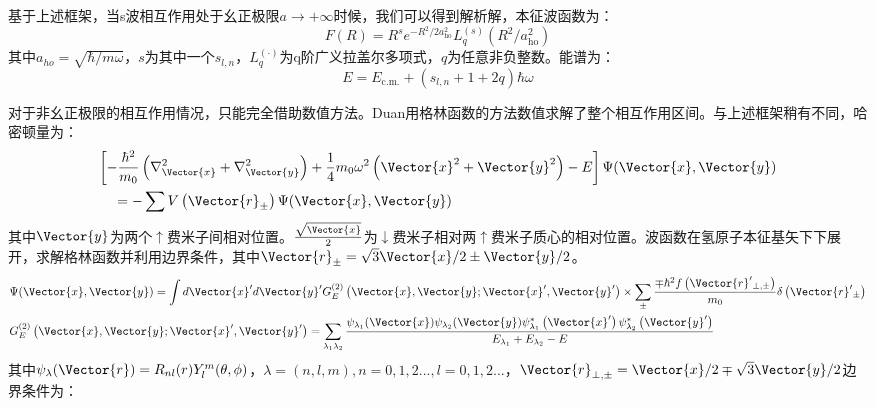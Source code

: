 基于上述框架，当s波相互作用处于幺正极限$a\to+\infty$时候，我们可以得到解析解，本征波函数为：
\begin{equation}
 F(R)=R^{s} e^{-R^{2} / 2 a_{\mathrm{ho}}^{2}} L_{q}^{(s)}\left(R^{2} / a_{\mathrm{ho}}^{2}\right)
\end{equation}
其中$a_{ho}=\sqrt{\hbar/m\omega}$，$s$为其中一个$s_{l,n}$，$L^{(\cdot)}_q$为q阶广义拉盖尔多项式，$q$为任意非负整数。能谱为：
\begin{equation}
E=E_{\mathrm{c} . \mathrm{m} .}+\left(s_{l, n}+1+2 q\right) \hbar \omega
\end{equation}

对于非幺正极限的相互作用情况，只能完全借助数值方法。Duan\cite{LmDuan2007levelcrossing}用格林函数的方法数值求解了整个相互作用区间。与上述框架稍有不同，哈密顿量为：
\begin{equation}
\begin{aligned}
&{\left[-\frac{\hbar^{2}}{m_{0}}\left(\nabla_{\Vector{x}}^{2}+\nabla_{\Vector{y}}^{2}\right)+\frac{1}{4} m_{0} \omega^{2}\left(\Vector{x}^{2}+\Vector{y}^{2}\right)-E\right] \Psi(\Vector{x}, \Vector{y})} \\
&\quad=-\sum V\left(\Vector{r}_{\pm}\right) \Psi(\Vector{x}, \Vector{y})
\end{aligned}
\end{equation}
其中$\Vector{y}$为两个$\uparrow$费米子间相对位置。$\frac{\sqrt{\Vector{x}}}{2}$为$\downarrow$费米子相对两$\uparrow$费米子质心的相对位置。波函数在氢原子本征基矢下下展开，求解格林函数并利用边界条件，其中$\Vector{r}_{\pm}=\sqrt{3} \Vector{x} / 2 \pm \Vector{y} / 2$。
\begin{equation}
\begin{aligned}
&\Psi(\Vector{x}, \Vector{y})= \int d \Vector{x}^{\prime} d \Vector{y}^{\prime} G_{E}^{(2)}\left(\Vector{x}, \Vector{y} ; \Vector{x}^{\prime}, \Vector{y}^{\prime}\right)\times \sum_{\pm} \frac{\mp \hbar^{2} f\left(\Vector{r}^{\prime}{ }_{\perp, \pm}\right)}{m_{0}} \delta\left(\Vector{r}^{\prime}{ }_{\pm}\right)\\
&G_{E}^{(2)}\left(\Vector{x}, \Vector{y} ; \Vector{x}^{\prime}, \Vector{y}^{\prime}\right)=\sum_{\lambda_{1} \lambda_{2}} \frac{\psi_{\lambda_{1}}(\Vector{x}) \psi_{\lambda_{2}}(\Vector{y}) \psi_{\lambda_{1}}^{*}\left(\Vector{x}^{\prime}\right) \psi_{\lambda_{2}}^{*}\left(\Vector{y}^{\prime}\right)}{E_{\lambda_{1}}+E_{\lambda_{2}}-E}\\
\end{aligned}
\end{equation}
其中$\psi_\lambda(\Vector{r}) = R_{nl}(r)Y_l^m(\theta,\phi)$，$\lambda = (n,l,m),n=0,1,2...,l=0,1,2...$，$\Vector{r}_{\perp, \pm}=\Vector{x} / 2 \mp \sqrt{3} \Vector{y} / 2$边界条件为：
